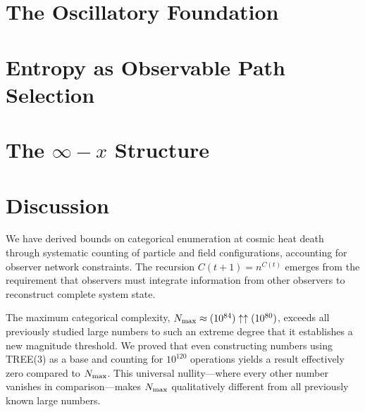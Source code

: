 \section{The Oscillatory Foundation}


\section{Entropy as Observable Path Selection}


\section{The $\infty - x$ Structure}


\section{Discussion}

We have derived bounds on categorical enumeration at cosmic heat death through systematic counting of particle and field configurations, accounting for observer network constraints. The recursion $C(t+1) = n^{C(t)}$ emerges from the requirement that observers must integrate information from other observers to reconstruct complete system state.

The maximum categorical complexity, $N_{\text{max}} \approx (10^{84}) \uparrow\uparrow (10^{80})$, exceeds all previously studied large numbers to such an extreme degree that it establishes a new magnitude threshold. We proved that even constructing numbers using TREE(3) as a base and counting for $10^{120}$ operations yields a result effectively zero compared to $N_{\text{max}}$. This universal nullity—where every other number vanishes in comparison—makes $N_{\text{max}}$ qualitatively different from all previously known large numbers.

